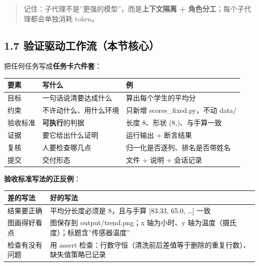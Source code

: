 \begin{quote}
记住：子代理不是''更强的模型''，而是\textbf{上下文隔离 +
角色分工}；每个子代理都会单独消耗 token。
\end{quote}

\subsection{1.7
验证驱动工作流（本节核心）}\label{ux9a8cux8bc1ux9a71ux52a8ux5de5ux4f5cux6d41ux672cux8282ux6838ux5fc3}

把任何任务写成\textbf{任务卡六件套}：

{\def\LTcaptype{none} %
\begin{longtable}[]{@{}lll@{}}
\toprule\noalign{}
要素 & 写什么 & 例 \\
\midrule\noalign{}
\endhead
\bottomrule\noalign{}
\endlastfoot
目标 & 一句话说清要达成什么 & 算出每个学生的平均分 \\
约束 & 不许动什么、用什么环境 & 只新增 scores\_fixed.py，不动 data/ \\
验收标准 & \textbf{可执行}的判据 & 长度 8、形状 (8,)、与手算一致 \\
证据 & 要它给出什么证明 & 运行输出 + 断言结果 \\
复核 & 人要检查哪几点 & 归一化是否逐列、排名是否带姓名 \\
提交 & 交付形态 & 文件 + 说明 + 会话记录 \\
\end{longtable}
}

\textbf{验收标准写法的正反例}：

{\def\LTcaptype{none} %
\begin{longtable}[]{@{}
  >{\raggedright\arraybackslash}p{}
  >{\raggedright\arraybackslash}p{}@{}}
\toprule\noalign{}
\begin{minipage}[b]{\linewidth}\raggedright
差的写法
\end{minipage} & \begin{minipage}[b]{\linewidth}\raggedright
好的写法
\end{minipage} \\
\midrule\noalign{}
\endhead
\bottomrule\noalign{}
\endlastfoot
结果要正确 & 平均分长度必须是 8，且与手算 {[}83.33, 65.0, \ldots{]}
一致 \\
图画得好看点 & 图保存到 output/trend.png；x 轴为小时、y
轴为温度（摄氏度）；标题含''传感器温度'' \\
检查有没有问题 & 用 assert
检查：行数守恒（清洗前后差值等于删除的重复行数）、缺失值策略已记录 \\
\end{longtable}
}

